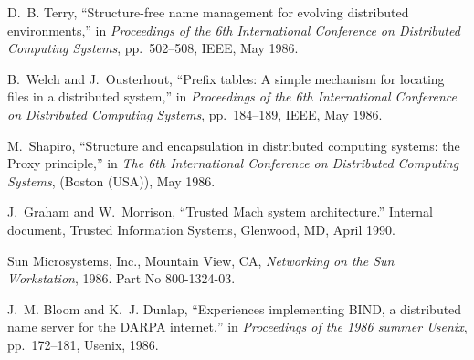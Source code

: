\begin{thebibliography}{10}
{
D.~B. Terry, ``Structure-free name management for evolving distributed
  environments,'' in {\em Proceedings of the 6th International Conference on
  Distributed Computing Systems}, pp.~502--508, IEEE, May 1986.

B.~Welch and J.~Ousterhout, ``Prefix tables: A simple mechanism for locating
  files in a distributed system,'' in {\em Proceedings of the 6th International
  Conference on Distributed Computing Systems}, pp.~184--189, IEEE, May 1986.

M.~Shapiro, ``Structure and encapsulation in distributed computing systems: the
  {P}roxy principle,'' in {\em The 6th International Conference on Distributed
  Computing Systems}, (Boston ({USA})), May 1986.

J.~Graham and W.~Morrison, ``Trusted {Mach} system architecture.'' Internal
  document, Trusted Information Systems, Glenwood, MD, April 1990.

{Sun Microsystems, Inc.}, Mountain View, CA, {\em Networking on the {S}un
  Workstation}, 1986.
\newblock Part No 800-1324-03.

J.~M. Bloom and K.~J. Dunlap, ``Experiences implementing {BIND}, a distributed
  name server for the {DARPA} internet,'' in {\em Proceedings of the 1986
  summer Usenix}, pp.~172--181, Usenix, 1986.

} %

\end{thebibliography}


